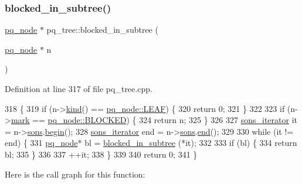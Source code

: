 \subsubsection{\texorpdfstring{blocked\+\_\+in\+\_\+subtree()}{blocked\_in\_subtree()}}
{\footnotesize\ttfamily \mbox{\hyperlink{classpq__node}{pq\+\_\+node}} $\ast$ pq\+\_\+tree\+::blocked\+\_\+in\+\_\+subtree (\begin{DoxyParamCaption}\item[{\mbox{\hyperlink{classpq__node}{pq\+\_\+node}} $\ast$}]{n }\end{DoxyParamCaption})\hspace{0.3cm}{\ttfamily [private]}}



Definition at line 317 of file pq\+\_\+tree.\+cpp.


\begin{DoxyCode}
318 \{
319     \textcolor{keywordflow}{if} (n->\mbox{\hyperlink{classpq__node_aa9873c0cfad88bc4404857ce57d422e4}{kind}}() == \mbox{\hyperlink{classpq__node_a96827bdca8bf81d20213405dd27f8fa6a80289f856abee0f9cb17852111ba9991}{pq\_node::LEAF}}) \{
320     \textcolor{keywordflow}{return} 0;
321     \} 
322 
323     \textcolor{keywordflow}{if} (n->\mbox{\hyperlink{classpq__node_aee913582a7b268ce2570bee8a8367c50}{mark}} == \mbox{\hyperlink{classpq__node_a6236b20cd5f6cc02cb5f637ed34c96d9a70312622ded9f04f068838ec195fc53c}{pq\_node::BLOCKED}}) \{
324     \textcolor{keywordflow}{return} n;
325     \}
326 
327     \mbox{\hyperlink{classpq__tree_ab47263066d4b0acc70e00043870d748a}{sons\_iterator}} it = n->\mbox{\hyperlink{classpq__node_a2cc030cfa4560872acea8b50ebd0542b}{sons}}.\mbox{\hyperlink{classsymlist_a525b8d44af5d771fe15916372515cce0}{begin}}();
328     \mbox{\hyperlink{classpq__tree_ab47263066d4b0acc70e00043870d748a}{sons\_iterator}} end = n->\mbox{\hyperlink{classpq__node_a2cc030cfa4560872acea8b50ebd0542b}{sons}}.\mbox{\hyperlink{classsymlist_a7283589fa01f79d722f8256d7a6a7883}{end}}();
329 
330     \textcolor{keywordflow}{while} (it != end) \{
331     \mbox{\hyperlink{classpq__node}{pq\_node}}* bl = \mbox{\hyperlink{classpq__tree_a6ce932de3106ad6c9d84bb2058784b0a}{blocked\_in\_subtree}} (*it);
332     
333     \textcolor{keywordflow}{if} (bl) \{
334         \textcolor{keywordflow}{return} bl;
335     \}
336 
337     ++it;
338     \}
339 
340     \textcolor{keywordflow}{return} 0;
341 \}
\end{DoxyCode}
Here is the call graph for this function\+:\nopagebreak
